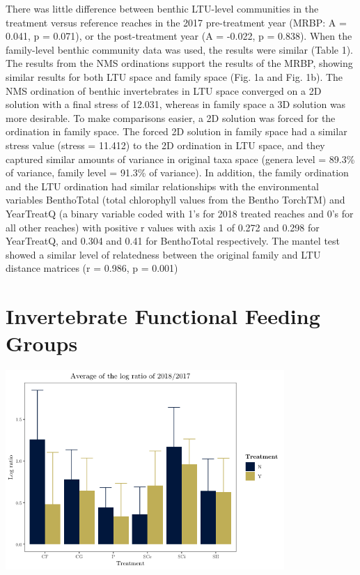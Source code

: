 \documentclass[double,12pt]{beavtex}
\begin{document}
  There was little difference between benthic LTU-level communities in the
  treatment versus reference reaches in the 2017 pre-treatment year (MRBP:
  A = 0.041, p = 0.071), or the post-treatment year (A = -0.022, p =
  0.838). When the family-level benthic community data was used, the
  results were similar (Table 1). The results from the NMS ordinations
  support the results of the MRBP, showing similar results for both LTU
  space and family space (Fig. 1a and Fig. 1b). The NMS ordination of
  benthic invertebrates in LTU space converged on a 2D solution with a
  final stress of 12.031, whereas in family space a 3D solution was more
  desirable. To make comparisons easier, a 2D solution was forced for the
  ordination in family space. The forced 2D solution in family space had a
  similar stress value (stress = 11.412) to the 2D ordination in LTU
  space, and they captured similar amounts of variance in original taxa
  space (genera level = 89.3\% of variance, family level = 91.3\% of
  variance). In addition, the family ordination and the LTU ordination had
  similar relationships with the environmental variables BenthoTotal
  (total chlorophyll values from the Bentho TorchTM) and YearTreatQ (a
  binary variable coded with 1's for 2018 treated reaches and 0's for all
  other reaches) with positive r values with axis 1 of 0.272 and 0.298 for
  YearTreatQ, and 0.304 and 0.41 for BenthoTotal respectively. The mantel
  test showed a similar level of relatedness between the original family
  and LTU distance matrices (r = 0.986, p = 0.001)
  
  \section*{Invertebrate Functional Feeding
  Groups}\label{invertebrate-functional-feeding-groups}
  
  \includegraphics[width=4.16667in]{Final_Figures_and_Stats_files/figure-html/AvgFFGratio-1.png}
  
\end{document}
